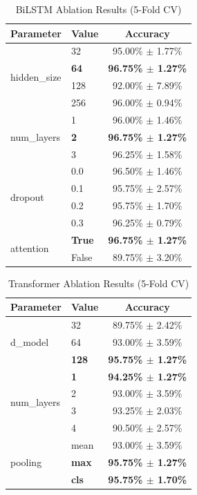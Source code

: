 \documentclass[conference]{IEEEtran}
\begin{document}
\begin{table}[htbp]
\caption{BiLSTM Ablation Results (5-Fold CV)}
\label{tab:ablation_bilstm}
\centering
\begin{tabular}{llc}
\toprule
\textbf{Parameter} & \textbf{Value} & \textbf{Accuracy} \\
\midrule
\multirow{4}{*}{hidden\_size} & 32 & 95.00\% $\pm$ 1.77\% \\
& \textbf{64} & \textbf{96.75\% $\pm$ 1.27\%} \\
& 128 & 92.00\% $\pm$ 7.89\% \\
& 256 & 96.00\% $\pm$ 0.94\% \\
\midrule
\multirow{3}{*}{num\_layers} & 1 & 96.00\% $\pm$ 1.46\% \\
& \textbf{2} & \textbf{96.75\% $\pm$ 1.27\%} \\
& 3 & 96.25\% $\pm$ 1.58\% \\
\midrule
\multirow{4}{*}{dropout} & 0.0 & 96.50\% $\pm$ 1.46\% \\
& 0.1 & 95.75\% $\pm$ 2.57\% \\
& 0.2 & 95.75\% $\pm$ 1.70\% \\
& 0.3 & 96.25\% $\pm$ 0.79\% \\
\midrule
\multirow{2}{*}{attention} & \textbf{True} & \textbf{96.75\% $\pm$ 1.27\%} \\
& False & 89.75\% $\pm$ 3.20\% \\
\bottomrule
\end{tabular}
\end{table}

\begin{table}[htbp]
\caption{Transformer Ablation Results (5-Fold CV)}
\label{tab:ablation_transformer}
\centering
\begin{tabular}{llc}
\toprule
\textbf{Parameter} & \textbf{Value} & \textbf{Accuracy} \\
\midrule
\multirow{3}{*}{d\_model} & 32 & 89.75\% $\pm$ 2.42\% \\
& 64 & 93.00\% $\pm$ 3.59\% \\
& \textbf{128} & \textbf{95.75\% $\pm$ 1.27\%} \\
\midrule
\multirow{4}{*}{num\_layers} & \textbf{1} & \textbf{94.25\% $\pm$ 1.27\%} \\
& 2 & 93.00\% $\pm$ 3.59\% \\
& 3 & 93.25\% $\pm$ 2.03\% \\
& 4 & 90.50\% $\pm$ 2.57\% \\
\midrule
\multirow{3}{*}{pooling} & mean & 93.00\% $\pm$ 3.59\% \\
& \textbf{max} & \textbf{95.75\% $\pm$ 1.27\%} \\
& \textbf{cls} & \textbf{95.75\% $\pm$ 1.70\%} \\
\bottomrule
\end{tabular}
\end{table}
\end{document}
